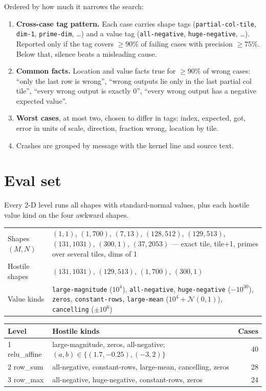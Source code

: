 \documentclass[11pt]{article}
\newcommand{\code}[1]{\texttt{#1}}
\begin{document}
Ordered by how much it narrows the search:
\begin{enumerate}
  \item \textbf{Cross-case tag pattern.} Each case carries shape tags
        (\code{partial-col-tile}, \code{dim-1}, \code{prime-dim}, \dots) and a value tag
        (\code{all-negative}, \code{huge-negative}, \dots). Reported only if the tag covers
        $\ge 90\%$ of failing cases with precision $\ge 75\%$. Below that, silence beats a
        misleading cause.
  \item \textbf{Common facts.} Location and value facts true for $\ge 90\%$ of wrong cases:
        ``only the last row is wrong'', ``wrong outputs lie only in the last partial col
        tile'', ``every wrong output is exactly 0'', ``every wrong output has a negative
        expected value''.
  \item \textbf{Worst cases}, at most two, chosen to differ in tags: index, expected, got,
        error in units of scale, direction, fraction wrong, location by tile.
  \item Crashes are grouped by message with the kernel line and source text.
\end{enumerate}

\section{Eval set}

Every 2-D level runs all shapes with standard-normal values, plus each hostile value kind on
the four awkward shapes.

\noindent\begin{tabularx}{\linewidth}{@{}lY@{}}
\toprule
Shapes $(M,N)$ & $(1,1)$, $(1,700)$, $(7,13)$, $(128,512)$, $(129,513)$, $(131,1031)$,
  $(300,1)$, $(37,2053)$ --- exact tile, tile+1, primes over several tiles, dims of 1 \\
Hostile shapes & $(131,1031)$, $(129,513)$, $(1,700)$, $(300,1)$ \\
Value kinds & \code{large-magnitude} ($10^4$), \code{all-negative}, \code{huge-negative}
  ($-10^{30}$), \code{zeros}, \code{constant-rows}, \code{large-mean} ($10^4+\mathcal N(0,1)$),
  \code{cancelling} ($\pm10^6$) \\
\bottomrule
\end{tabularx}

\medskip
\noindent\begin{tabularx}{\linewidth}{@{}lYr@{}}
\toprule
Level & Hostile kinds & Cases \\
 relu\_affine & large-magnitude, zeros, all-negative; $(a,b)\in\{(1.7,-0.25),(-3,2)\}$ & 40 \\
2 row\_sum & all-negative, constant-rows, large-mean, cancelling, zeros & 28 \\
3 row\_max & all-negative, huge-negative, constant-rows, zeros & 24 \\
\bottomrule
\end{tabularx}
\end{document}
